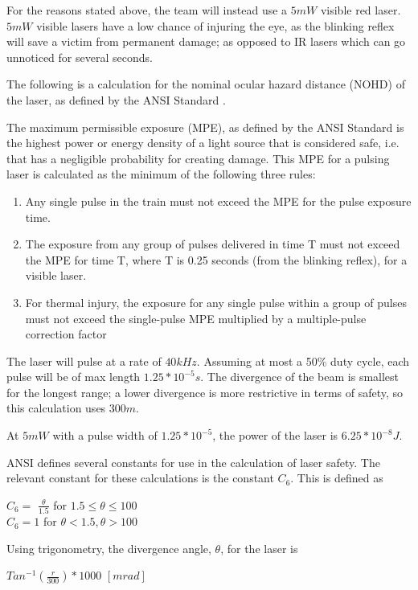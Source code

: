 \documentclass[letterpaper,10pt]{article}
\begin{document}
\begin{spacing}{1.15}
For the reasons stated above, the team will instead use a $5mW$ visible red laser. $5mW$ visible lasers have a low chance of injuring the eye, as the blinking reflex will save a victim from permanent damage; as opposed to IR lasers which can go unnoticed for several seconds. 

The following is a calculation for the nominal ocular hazard distance (NOHD) of the laser, as defined by the ANSI Standard \cite{ANSI}.

The maximum permissible exposure (MPE), as defined by the ANSI Standard \cite{ANSI} is the highest power or energy density of a light source that is considered safe, i.e. that has a negligible probability for creating damage. This MPE for a pulsing laser is calculated as the minimum of the following three rules:

\begin{enumerate}
	\item Any single pulse in the train must not exceed the MPE for the pulse exposure time.
	\item The exposure from any group of pulses delivered in time T must not exceed the MPE for
	time T, where T is 0.25 seconds (from the blinking reflex), for a visible laser. 
	\item For thermal injury, the exposure for any single pulse within a group of pulses must not
	exceed the single-pulse MPE multiplied by a multiple-pulse correction factor
\end{enumerate}

The laser will pulse at a rate of $40 kHz$. Assuming at most a 50\% duty cycle, each pulse will be of max length $1.25*10^{-5} s$. The divergence of the beam is smallest for the longest range; a lower divergence is more restrictive in terms of safety, so this calculation uses $300m$. 

At $5mW$ with a pulse width of $1.25*10^{-5}$, the power of the laser is $6.25*10^{-8} J$. 

ANSI defines several constants for use in the calculation of laser safety. The relevant constant for these calculations is the constant $C_6$. This is defined as 
\begin{center}
	\large
	$C_6 =$
	$\frac{\theta}{1.5}$ for $1.5 \leq \theta \leq 100$\\
	$C_6 = 1$ for $\theta < 1.5, \theta > 100$
\end{center}

Using trigonometry, the divergence angle, $\theta$, for the laser is 
\begin{center}
	\large
	$Tan^{-1}(\frac{r}{300})* 1000$ $[mrad]$
\end{center}


\end{spacing}
\end{document}
